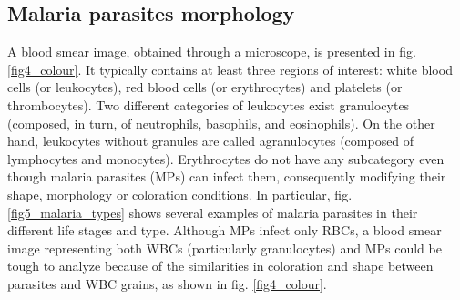 {	\subsection{Malaria parasites morphology}
	A blood smear image, obtained through a microscope, is presented in fig. \ref{fig4_colour}. It typically contains at least three regions of interest: white blood cells (or leukocytes), red blood cells (or erythrocytes) and platelets (or thrombocytes). Two different categories of leukocytes exist granulocytes (composed, in turn, of neutrophils, basophils, and eosinophils).
	On the other hand, leukocytes without granules are called agranulocytes (composed of lymphocytes and monocytes). Erythrocytes do not have any subcategory even though malaria parasites (MPs) can infect them, consequently modifying their shape, morphology or coloration conditions. In particular, fig. \ref{fig5_malaria_types} shows several examples of malaria parasites in their different life stages and type.
	Although MPs infect only RBCs, a blood smear image representing both WBCs (particularly granulocytes) and MPs could be tough to analyze because of the similarities in coloration and shape between parasites and WBC grains, as shown in fig. \ref{fig4_colour}.
	
}
